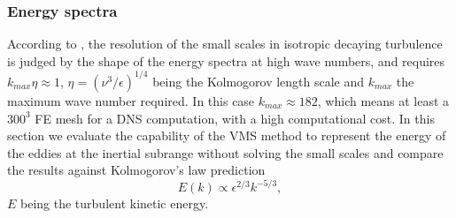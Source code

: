 
\subsubsection{Energy spectra}
According to \cite{mansour_decay_1994}, the resolution of the small scales in isotropic decaying turbulence is judged by the shape of the energy spectra at high wave numbers, and requires 
$k_{max}\eta\approx1$, $\eta=(\nu^3/\epsilon)^{1/4}$ being the Kolmogorov length scale and $k_{max}$ the maximum wave number required. In this case $k_{max}\approx182$, which means at least a $300^3$ FE mesh for a DNS computation, with a high computational cost.
In this section we evaluate the capability of the VMS method to represent the energy of the  eddies at the inertial subrange without solving the small scales and compare the results against Kolmogorov's law prediction
$$E(k)\propto\epsilon^{2/3}k^{-5/3},$$
$E$ being the turbulent kinetic energy.

